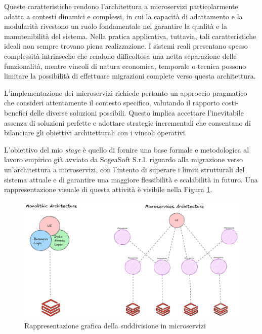             \vspace{0.2 em}
            \noindent Queste caratteristiche rendono l'architettura a microservizi particolarmente adatta a contesti dinamici e complessi, in cui la capacità di adattamento e la modularità rivestono un ruolo fondamentale nel garantire la qualità e la manutenibilità del sistema. Nella pratica applicativa, tuttavia, tali caratteristiche ideali non sempre trovano piena realizzazione. I sistemi reali presentano spesso complessità intrinseche che rendono difficoltosa una netta separazione delle funzionalità, mentre vincoli di natura economica, temporale o tecnica possono limitare la possibilità di effettuare migrazioni complete verso questa architettura. 

            \noindent L'implementazione dei microservizi richiede pertanto un approccio pragmatico che consideri attentamente il contesto specifico, valutando il rapporto costi-benefici delle diverse soluzioni possibili. Questo implica accettare l'inevitabile assenza di soluzioni perfette e adottare strategie incrementali che consentano di bilanciare gli obiettivi architetturali con i vincoli operativi.

            \vspace{0.2 em}
            \noindent L'obiettivo del mio \textit{stage} è quello di fornire una base formale e metodologica al lavoro empirico già avviato da SogeaSoft S.r.l. riguardo alla migrazione verso un'architettura a microservizi, con l'intento di superare i limiti strutturali del sistema attuale e di garantire una maggiore flessibilità e scalabilità in futuro. Una rappresentazione visuale di questa attività è visibile nella Figura \ref{fig:monolith-vs-microservices}.
            
            \begin{figure}[H]
                \centering
                \includegraphics[width=1.0\linewidth]{BCS-Tessi/images/Monolith-Microservices.png}
                \caption[Rappresentazione grafica della suddivisione in microservizi]{Rappresentazione grafica della suddivisione in microservizi}
                \label{fig:monolith-vs-microservices}
            \end{figure}

